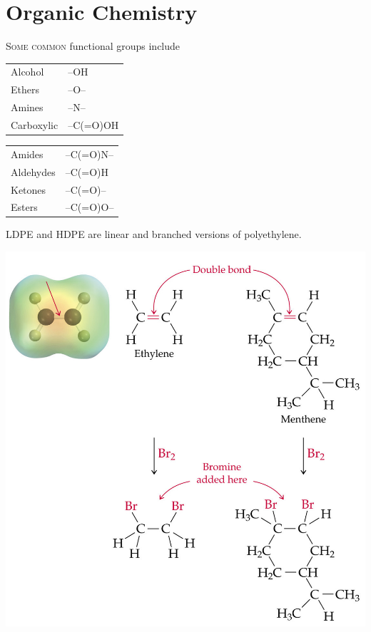 \documentclass{tufte-book}
\begin{document}
\section{Organic Chemistry}

\textsc{Some common} functional groups include
%
\begin{center}
  \begin{tabular}{ll}
    Alcohol & --OH \\
    Ethers & --O-- \\
    Amines & --N-- \\
    Carboxylic & --C(=O)OH
  \end{tabular} \qquad\qquad
  \begin{tabular}{ll}
    Amides & --C(=O)N-- \\
    Aldehydes & --C(=O)H \\
    Ketones & --C(=O)-- \\
    Esters & --C(=O)O--
  \end{tabular}
\end{center}
%
LDPE and HDPE are linear and branched versions of polyethylene.
%
\begin{marginfigure}[0mm]
\begin{center}
  \includegraphics[width=\textwidth]{organic}
\end{center}
\end{marginfigure}
\end{document}

